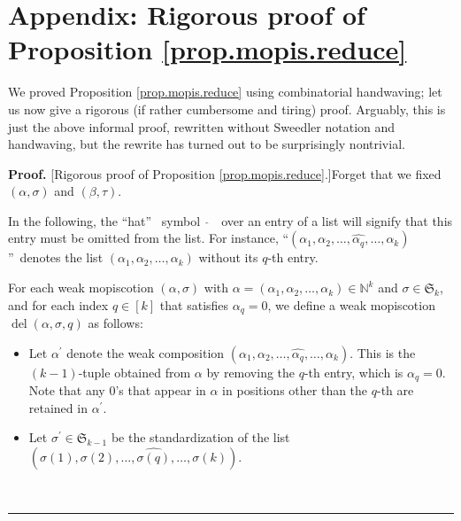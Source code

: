 \documentclass[numbers=enddot,12pt,final,onecolumn,notitlepage]{scrartcl}%
\theoremstyle{definition}
\newenvironment{fineprint}{\begin{small}}{\end{small}}
\newenvironment{proof}[1][Proof]{\noindent\textbf{#1.} }{\ \rule{0.5em}{0.5em}}
\begin{document}
\appendix


\section{\label{sec.pas-proof}Appendix: Rigorous proof of Proposition
\ref{prop.mopis.reduce}}

\begin{fineprint}
We proved Proposition \ref{prop.mopis.reduce} using combinatorial handwaving;
let us now give a rigorous (if rather cumbersome and tiring) proof. Arguably,
this is just the above informal proof, rewritten without Sweedler notation and
handwaving, but the rewrite has turned out to be surprisingly nontrivial.

\begin{proof}
[Rigorous proof of Proposition \ref{prop.mopis.reduce}.]Forget that we fixed
$\left(  \alpha,\sigma\right)  $ and $\left(  \beta,\tau\right)  $.

In the following, the \textquotedblleft hat\textquotedblright%
\ symbol\ $\ \widehat{}$\ \ over an entry of a list will signify that this
entry must be omitted from the list. For instance, \textquotedblleft$\left(
\alpha_{1},\alpha_{2},\ldots,\widehat{\alpha_{q}},\ldots,\alpha_{k}\right)
$\textquotedblright\ denotes the list $\left(  \alpha_{1},\alpha_{2}%
,\ldots,\alpha_{k}\right)  $ without its $q$-th entry.

For each weak mopiscotion $\left(  \alpha,\sigma\right)  $ with $\alpha
=\left(  \alpha_{1},\alpha_{2},\ldots,\alpha_{k}\right)  \in\mathbb{N}^{k}$
and $\sigma\in\mathfrak{S}_{k}$, and for each index $q\in\left[  k\right]  $
that satisfies $\alpha_{q}=0$, we define a weak mopiscotion
$\operatorname*{del}\left(  \alpha,\sigma,q\right)  $ as follows:

\begin{itemize}
\item Let $\alpha^{\prime}$ denote the weak composition $\left(  \alpha
_{1},\alpha_{2},\ldots,\widehat{\alpha_{q}},\ldots,\alpha_{k}\right)  $. This
is the $\left(  k-1\right)  $-tuple obtained from $\alpha$ by removing the
$q$-th entry, which is $\alpha_{q}=0$. Note that any $0$'s that appear in
$\alpha$ in positions other than the $q$-th are retained in $\alpha^{\prime}$.

\item Let $\sigma^{\prime}\in\mathfrak{S}_{k-1}$ be the standardization of the
list $\left(  \sigma\left(  1\right)  ,\sigma\left(  2\right)  ,\ldots
,\widehat{\sigma\left(  q\right)  },\ldots,\sigma\left(  k\right)  \right)  $.


\end{itemize}
\end{proof}
\end{fineprint}
\end{document}
